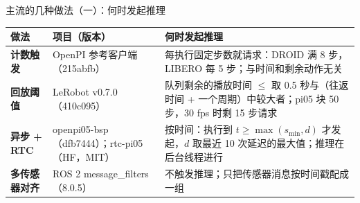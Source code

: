 \begin{frame}[t]{主流的几种做法（一）：何时发起推理}
\scriptsize
\renewcommand{\arraystretch}{1.12}
\setlength{\tabcolsep}{3pt}
\begin{tabularx}{\textwidth}{>{\bfseries}p{2.3cm} p{3.3cm} Y}
\toprule
{}
做法 & 项目（版本） & 何时发起推理 \\
\midrule
计数触发 & OpenPI 参考客户端（215abfb） & 每执行固定步数就请求：DROID 满 8 步，LIBERO 每 5 步；与时间和剩余动作无关 \\
回放阈值 & LeRobot v0.7.0（410c095） & 队列剩余的播放时间 $\le$ 取 0.5 秒与（往返时间 + 一个周期）中较大者；pi05 块 50 步，30 fps 时剩 15 步请求 \\
异步 + RTC & openpi05-bsp（dfb7444）；rtc-pi05（HF，MIT） & 按时间：执行到 $t \ge \max(s_{\min}, d)$ 才发起，$d$ 取最近 10 次延迟的最大值；推理在后台线程进行 \\
多传感器对齐 & ROS 2 message\_filters（8.0.5） & 不触发推理；只把传感器消息按时间戳配成一组 \\
\bottomrule
\end{tabularx}
\par{}
\par{}
\end{frame}

